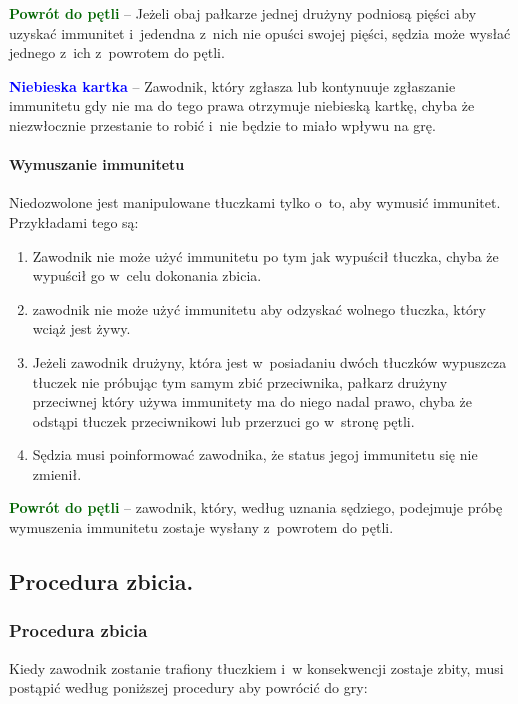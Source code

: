 \documentclass[12pt]{article}
\newcommand\bluecard[1]{\bgroup\textcolor{blue}{\textbf{#1}}}
\newcommand\other[1]{\bgroup\textcolor{darkgreen}{\textbf{#1}}}
\begin{document}
\other{Powrót do pętli} -- Jeżeli obaj pałkarze jednej drużyny podniosą
pięści aby uzyskać immunitet i~jedendna z~nich nie opuści swojej pięści,
sędzia może wysłać jednego z~ich z~powrotem do pętli.

\bluecard{Niebieska kartka} -- Zawodnik, który zgłasza lub kontynuuje
zgłaszanie immunitetu gdy nie ma do tego prawa otrzymuje niebieską
kartkę, chyba że niezwłocznie przestanie to robić i~nie będzie to miało
wpływu na grę.

\paragraph{Wymuszanie immunitetu}
Niedozwolone jest manipulowane
tłuczkami tylko o~to, aby wymusić immunitet. Przykładami tego są:

\begin{enumerate}
	\item
	      Zawodnik nie może użyć immunitetu po tym jak wypuścił tłuczka, chyba
	      że wypuścił go w~celu dokonania zbicia.
	\item
	      zawodnik nie może użyć immunitetu aby odzyskać wolnego tłuczka, który
	      wciąż jest żywy.
	\item
	      Jeżeli zawodnik drużyny, która jest w~posiadaniu dwóch tłuczków
	      wypuszcza tłuczek nie próbując tym samym zbić przeciwnika, pałkarz
	      drużyny przeciwnej który używa immunitety ma do niego nadal prawo,
	      chyba że odstąpi tłuczek przeciwnikowi lub przerzuci go w~stronę
	      pętli.
	\item
	      Sędzia musi poinformować zawodnika, że status jegoj immunitetu się nie
	      zmienił.
\end{enumerate}

\other{Powrót do pętli} -- zawodnik, który, według uznania sędziego,
podejmuje próbę wymuszenia immunitetu zostaje wysłany z~powrotem do
pętli.

\subsection{Procedura zbicia.}

\subsubsection{Procedura zbicia}

Kiedy zawodnik zostanie trafiony tłuczkiem i~w konsekwencji zostaje
zbity, musi postąpić według poniższej procedury aby powrócić do gry:
\end{document}
